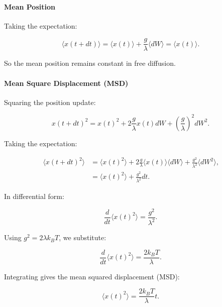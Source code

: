 \paragraph{Mean Position}

Taking the expectation:

\begin{equation}
  \langle x(t + dt) \rangle = \langle x(t) \rangle + \frac{g}{\lambda} \langle dW \rangle = \langle x(t) \rangle \text{.}
\end{equation}

So the mean position remains constant in free diffusion.

\paragraph{Mean Square Displacement (MSD)}

Squaring the position update:

\begin{equation}
  x(t + dt)^2 = x(t)^2 + 2 \frac{g}{\lambda} x(t) dW + \left( \frac{g}{\lambda} \right)^2 dW^2 \text{.}
\end{equation}

Taking the expectation:

\begin{align}
  \langle x(t + dt)^2 \rangle &= \langle x(t)^2 \rangle + 2 \frac{g}{\lambda} \langle x(t) \rangle \langle dW \rangle + \frac{g^2}{\lambda^2} \langle dW^2 \rangle \text{,}\\
  &= \langle x(t)^2 \rangle + \frac{g^2}{\lambda^2} dt \text{.}
\end{align}

In differential form:

\begin{equation}
  \frac{d}{dt} \langle x(t)^2 \rangle = \frac{g^2}{\lambda^2} \text{.}
\end{equation}

Using \( g^2 = 2 \lambda k_B T \), we substitute:

\begin{equation}
  \frac{d}{dt} \langle x(t)^2 \rangle = \frac{2 k_B T}{\lambda} \text{.}
\end{equation}

Integrating gives the mean squared displacement (MSD):

\begin{equation}
  \langle x(t)^2 \rangle = \frac{2 k_B T}{\lambda} t \text{.}
\end{equation}


